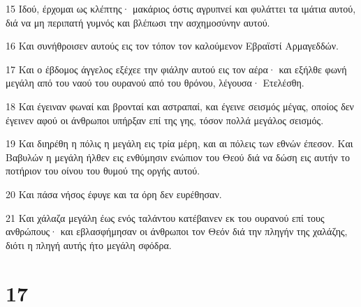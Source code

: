 \par 15 Ιδού, έρχομαι ως κλέπτης· μακάριος όστις αγρυπνεί και φυλάττει τα ιμάτια αυτού, διά να μη περιπατή γυμνός και βλέπωσι την ασχημοσύνην αυτού.
\par 16 Και συνήθροισεν αυτούς εις τον τόπον τον καλούμενον Εβραϊστί Αρμαγεδδών.
\par 17 Και ο έβδομος άγγελος εξέχεε την φιάλην αυτού εις τον αέρα· και εξήλθε φωνή μεγάλη από του ναού του ουρανού από του θρόνου, λέγουσα· Ετελέσθη.
\par 18 Και έγειναν φωναί και βρονταί και αστραπαί, και έγεινε σεισμός μέγας, οποίος δεν έγεινεν αφού οι άνθρωποι υπήρξαν επί της γης, τόσον πολλά μεγάλος σεισμός.
\par 19 Και διηρέθη η πόλις η μεγάλη εις τρία μέρη, και αι πόλεις των εθνών έπεσον. Και Βαβυλών η μεγάλη ήλθεν εις ενθύμησιν ενώπιον του Θεού διά να δώση εις αυτήν το ποτήριον του οίνου του θυμού της οργής αυτού.
\par 20 Και πάσα νήσος έφυγε και τα όρη δεν ευρέθησαν.
\par 21 Και χάλαζα μεγάλη έως ενός ταλάντου κατέβαινεν εκ του ουρανού επί τους ανθρώπους· και εβλασφήμησαν οι άνθρωποι τον Θεόν διά την πληγήν της χαλάζης, διότι η πληγή αυτής ήτο μεγάλη σφόδρα.

\chapter{17}

